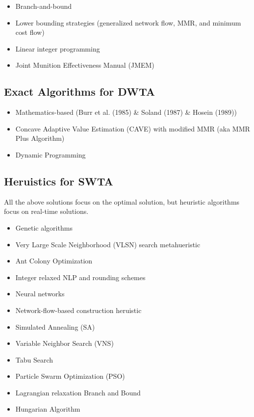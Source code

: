 \documentclass[12pt]{article} %
\begin{document}
\begin{itemize}
    \item Branch-and-bound
    \item Lower bounding strategies (generalized network flow, MMR, and minimum cost flow)
    \item Linear integer programming
    \item Joint Munition Effectiveness Manual (JMEM)
\end{itemize}

\subsection*{Exact Algorithms for DWTA}
\begin{itemize}
    \item Mathematics-based (Burr et al. (1985) \& Soland (1987) \& Hosein (1989))
    \item Concave Adaptive Value Estimation (CAVE) with modified MMR (aka MMR Plus Algorithm)
    \item Dynamic Programming
\end{itemize}

\subsection*{Heruistics for SWTA}
All the above solutions focus on the optimal solution, but heuristic algorithms focus on real-time solutions.

\begin{itemize}
    \item Genetic algorithms 
    \item Very Large Scale Neighborhood (VLSN) search metahueristic
    \item Ant Colony Optimization
    \item Integer relaxed NLP and rounding schemes 
    \item Neural networks
    \item Network-flow-based construction heruistic 
    \item Simulated Annealing (SA)
    \item Variable Neighbor Search (VNS)
    \item Tabu Search 
    \item Particle Swarm Optimization (PSO)
    \item Lagrangian relaxation Branch and Bound
    \item Hungarian Algorithm
\end{itemize}
\end{document}
